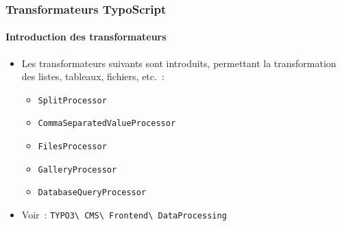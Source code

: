 \begin{frame}[fragile]
	\frametitle{Transformateurs TypoScript}
	\framesubtitle{Introduction des transformateurs}

	\lstset{basicstyle=\tiny\ttfamily}

	\begin{itemize}

		\item Les transformateurs suivants sont introduits, permettant la transformation des listes, tableaux,
			fichiers, etc.~:

			\begin{itemize}
				\item \texttt{SplitProcessor}
				\item \texttt{CommaSeparatedValueProcessor}
				\item \texttt{FilesProcessor}
				\item \texttt{GalleryProcessor}
				\item \texttt{DatabaseQueryProcessor}
			\end{itemize}

		\item Voir~:
			\texttt{TYPO3\textbackslash
				CMS\textbackslash
				Frontend\textbackslash
				DataProcessing}

	\end{itemize}

\end{frame}


